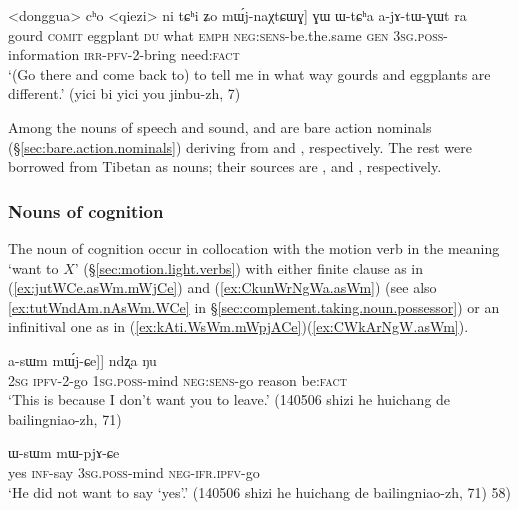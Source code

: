 \begin{exe}
\ex  \label{ex:WtCha.ajAtWGWt}
\gll <donggua> cʰo <qiezi> ni tɕʰi ʑo mɯ́j-naχtɕɯɣ] ɣɯ ɯ-tɕʰa a-jɤ-tɯ-ɣɯt ra \\
gourd \textsc{comit} eggplant \textsc{du} what \textsc{emph} \textsc{neg}:\textsc{sens}-be.the.same \textsc{gen} \textsc{3sg}.\textsc{poss}-information \textsc{irr}-\textsc{pfv}-2-bring need:\textsc{fact} \\
\glt `(Go there and come back to) to tell me in what way gourds and eggplants are different.' (yici bi yici you jinbu-zh, 7)
\end{exe}

Among the nouns of speech and sound,   and  are bare action nominals (§\ref{sec:bare.action.nominals}) deriving from  and , respectively. The rest were borrowed from Tibetan as nouns; their sources are ,  and , respectively.

\subsubsection{Nouns of cognition} \label{sec:nouns.cognition.complement}
The noun of cognition  occur in collocation with the motion verb  in the meaning `want to $X$' (§\ref{sec:motion.light.verbs}) with either finite clause as in (\ref{ex:jutWCe.asWm.mWjCe}) and (\ref{ex:CkunWrNgWa.asWm}) (see also \ref{ex:tutWndAm.nAsWm.WCe} in §\ref{sec:complement.taking.noun.possessor}) or an infinitival one as in (\ref{ex:kAti.WsWm.mWpjACe})(\ref{ex:CWkArNgW.asWm}).


\begin{exe}
\ex  \label{ex:jutWCe.asWm.mWjCe}
\gll [[nɤʑo ju-tɯ-ɕe] a-sɯm mɯ́j-ɕe]] ndʐa ŋu \\
\textsc{2sg} \textsc{ipfv}-2-go \textsc{1sg}.\textsc{poss}-mind \textsc{neg}:\textsc{sens}-go reason be:\textsc{fact} \\
\glt `This is because I don't want you to leave.' (140506 shizi he huichang de bailingniao-zh, 71)
\end{exe}

\begin{exe}
\ex  \label{ex:kAti.WsWm.mWpjACe}
\gll [``ɣa" kɤ-ti] ɯ-sɯm mɯ-pjɤ-ɕe \\
yes \textsc{inf}-say \textsc{3sg}.\textsc{poss}-mind \textsc{neg}-\textsc{ifr}.\textsc{ipfv}-go \\
\glt `He did not want to say `yes'.' (140506 shizi he huichang de bailingniao-zh, 71) 58)
\end{exe}

